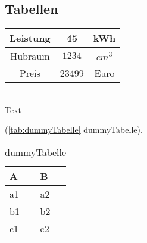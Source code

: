 \newpage

\subsection{Tabellen}\label{sec:tabellen}

\begin{tabular}{ccc}
	\toprule
		Leistung & 45 & kWh \\
	\midrule
		Hubraum & $1234$ & $cm^3$ \\
		Preis & 23499 & Euro \\
	\bottomrule
\end{tabular}\\

Text

(\autoref{tab:dummyTabelle} dummyTabelle).
\begin{table}[!hb] %
	\centering
	\begin{tabular} {ll}
		\toprule 
	  \textbf{A} & \textbf{B} \\
	  \midrule
    a1 & a2 \\
    b1 & b2 \\
    c1 & c2 \\
		\bottomrule
	\end{tabular}
	\caption{dummyTabelle}   %
	\label{tab:dummyTabelle} %
\end{table}

